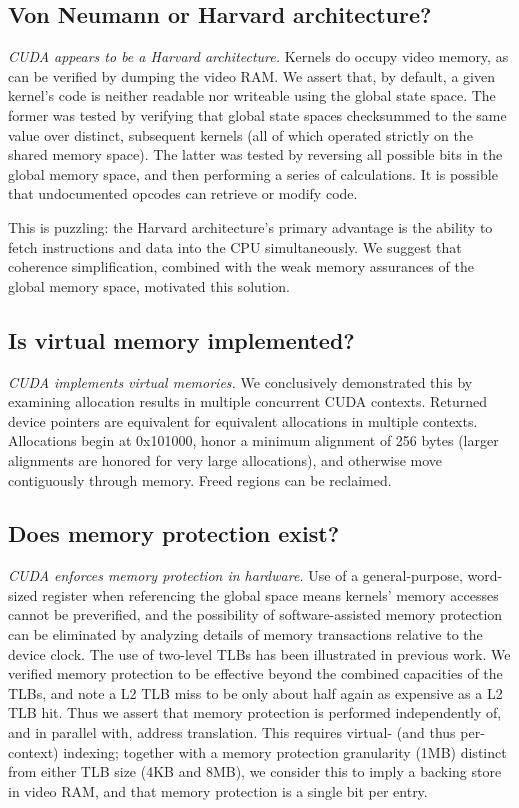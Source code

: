 \documentclass[letterpaper,10pt]{article}
\begin{document}
\begin{multicols}{2}
\subsection{Von Neumann or Harvard architecture?}
\textit{CUDA appears to be a Harvard architecture.} Kernels do occupy
video memory, as can be verified by dumping the video RAM. We assert that, by
default, a given kernel's code is neither readable nor writeable using
the global state space. The former was tested by verifying that global state
spaces checksummed to the same value over distinct, subsequent kernels (all of
which operated strictly on the shared memory space). The latter was tested by
reversing all possible bits in the global memory space, and then performing a
series of calculations. It is possible that undocumented opcodes can retrieve
or modify code.

This is puzzling: the Harvard architecture's primary advantage is the ability
to fetch instructions and data into the CPU simultaneously. We suggest that
coherence simplification, combined with the weak memory assurances of the global
memory space, motivated this solution.
\subsection{Is virtual memory implemented?}
\textit{CUDA implements virtual memories.} We conclusively demonstrated this
by examining allocation results in multiple concurrent CUDA contexts. Returned
device pointers are equivalent for equivalent allocations in multiple contexts.
Allocations begin at 0x101000, honor a minimum alignment of 256 bytes (larger
alignments are honored for very large allocations), and otherwise move
contiguously through memory. Freed regions can be reclaimed.
\subsection{Does memory protection exist?}
\textit{CUDA enforces memory protection in hardware.} Use of a general-purpose,
word-sized register when referencing the global space means kernels' memory
accesses cannot be preverified, and the possibility of software-assisted memory
protection can be eliminated by analyzing details of memory transactions
relative to the device clock\cite{microbenchmarks}. The use of two-level TLBs
has been illustrated in previous work\cite{demmel}. We verified memory
protection to be effective beyond the combined capacities of the TLBs, and
note a L2 TLB miss to be only about half again as expensive as a L2 TLB hit.
Thus we assert that memory protection is performed independently of, and in
parallel with, address translation. This requires virtual- (and thus per-context)
indexing; together with a memory protection granularity (1MB) distinct from
either TLB size (4KB and 8MB), we consider this to imply a backing store in
video RAM, and that memory protection is a single bit per entry.


\end{multicols}
\end{document}
